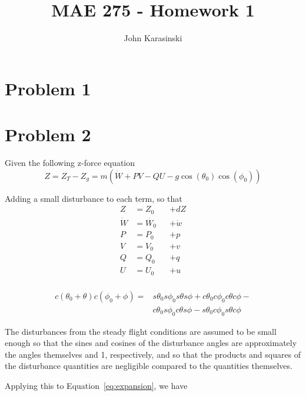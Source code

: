 \documentclass[a4paper]{article}
\title{MAE 275 - Homework 1}
\author{John Karasinski}
\begin{document}
\maketitle


\section{Problem 1}

\section{Problem 2}

Given the following z-force equation
\begin{equation*}
Z = Z_T - Z_g = m (\dot{W} + PV - QU - g\cos(\theta_0)\cos(\phi_0))
\end{equation*}

\noindent Adding a small disturbance to each term, so that
\begin{equation*}
\begin{alignedat}{2}
Z &= Z_0 & &+ dZ \\
\dot{W} &= \dot{W_0} & &+ \dot{w} \\
P &= P_0 & &+ p \\
V &= V_0 & &+ v \\
Q &= Q_0 & &+ q \\
U &= U_0 & &+ u \\
\end{alignedat}
\end{equation*}

\begin{equation} \label{eq:expansion}
\begin{split}
c(\theta_0 + \theta)c(\phi_0 + \phi) = & s\theta_0  s\phi_0 s\theta s\phi + c\theta_0 c\phi_0  c\theta c\phi - \\
                                       & c\theta_0  s\phi_0  c\theta s\phi - s\theta_0 c\phi_0 s\theta c\phi
\end{split}
\end{equation}

\noindent The disturbances from the steady flight conditions are assumed to be small enough so that the sines and cosines of the disturbance angles are approximately the angles themselves and 1, respectively, and so that the products and squares of the disturbance quantities are negligible compared to the quantities themselves.


\noindent Applying this to Equation~\ref{eq:expansion}, we have
\end{document}

